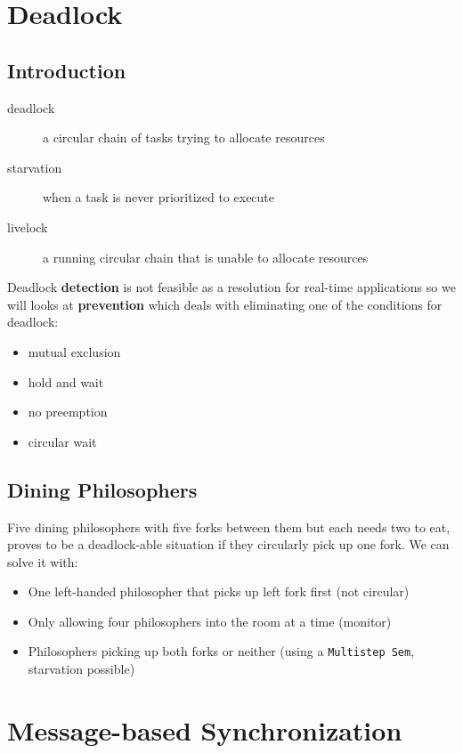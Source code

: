 \documentclass[]{article}
\theoremstyle{definition}
\begin{document}
	\section{Deadlock}
	\subsection{Introduction}
	\begin{description}
		\item[deadlock] a circular chain of tasks trying to allocate resources
		\item[starvation] when a task is never prioritized to execute
		\item[livelock] a running circular chain that is unable to allocate resources
	\end{description}

	Deadlock \textbf{detection} is not feasible as a resolution for real-time applications so we will looks at \textbf{prevention} which deals with eliminating one of the conditions for deadlock:
	\begin{itemize}
		\item mutual exclusion
		\item hold and wait
		\item no preemption
		\item circular wait
	\end{itemize}

	\subsection{Dining Philosophers}
	Five dining philosophers with five forks between them but each needs two to eat, proves to be a deadlock-able situation if they circularly pick up one fork. We can solve it with: 
	\begin{itemize}
		\item One left-handed philosopher that picks up left fork first (not circular)
		\item Only allowing four philosophers into the room at a time (monitor)
		\item Philosophers picking up both forks or neither (using a \lstinline|Multistep Sem|, starvation possible)
	\end{itemize}

	\section{Message-based Synchronization}
\end{document}
